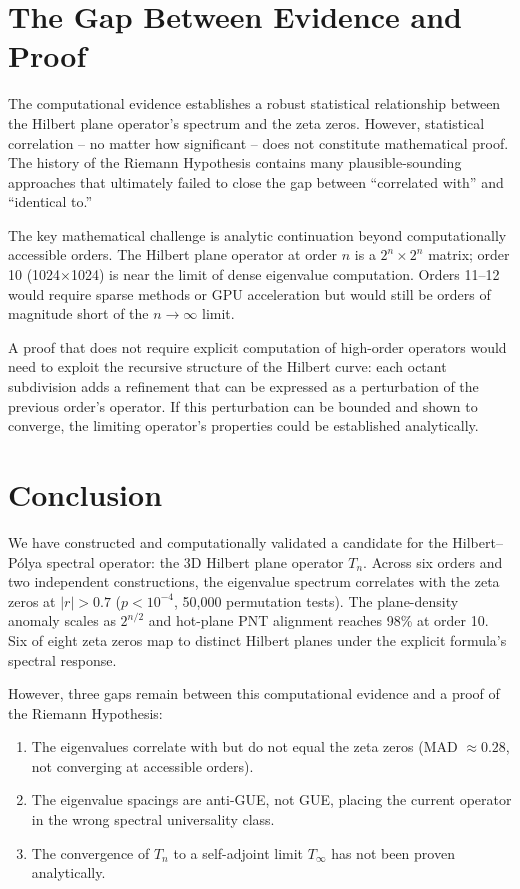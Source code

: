 \documentclass[11pt,a4paper]{article}
\begin{document}
\section{The Gap Between Evidence and Proof}

The computational evidence establishes a robust statistical
relationship between the Hilbert plane operator's spectrum and the zeta
zeros.  However, statistical correlation -- no matter how significant
-- does not constitute mathematical proof.  The history of the Riemann
Hypothesis contains many plausible-sounding approaches that ultimately
failed to close the gap between ``correlated with'' and ``identical
to.''

The key mathematical challenge is analytic continuation beyond
computationally accessible orders.  The Hilbert plane operator at
order $n$ is a $2^n \times 2^n$ matrix; order 10 (1024$\times$1024)
is near the limit of dense eigenvalue computation.  Orders 11--12
would require sparse methods or GPU acceleration but would still be
orders of magnitude short of the $n \to \infty$ limit.

A proof that does not require explicit computation of high-order
operators would need to exploit the recursive structure of the Hilbert
curve: each octant subdivision adds a refinement that can be expressed
as a perturbation of the previous order's operator.  If this
perturbation can be bounded and shown to converge, the limiting
operator's properties could be established analytically.

\section{Conclusion}

We have constructed and computationally validated a candidate for the
Hilbert--P\'{o}lya spectral operator: the 3D Hilbert plane operator
$T_n$.  Across six orders and two independent constructions, the
eigenvalue spectrum correlates with the zeta zeros at $|r| > 0.7$
($p < 10^{-4}$, 50,000 permutation tests).  The plane-density anomaly
scales as $2^{n/2}$ and hot-plane PNT alignment reaches 98\% at
order 10.  Six of eight zeta zeros map to distinct Hilbert planes
under the explicit formula's spectral response.

However, three gaps remain between this computational evidence and a
proof of the Riemann Hypothesis:

\begin{enumerate}
\item The eigenvalues correlate with but do not equal the zeta zeros
   (MAD $\approx 0.28$, not converging at accessible orders).
\item The eigenvalue spacings are anti-GUE, not GUE, placing the
   current operator in the wrong spectral universality class.
\item The convergence of $T_n$ to a self-adjoint limit $T_\infty$
   has not been proven analytically.
\end{enumerate}
\end{document}
